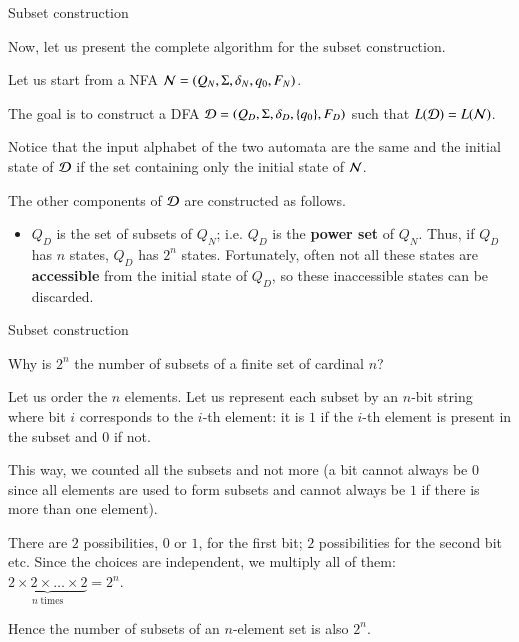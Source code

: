%
\begin{frame}{Subset construction}

Now, let us present the complete algorithm for the subset
construction.

\bigskip

Let us start from a NFA \({\cal N} = (Q_N, \Sigma, \delta_N, q_0, F_N)\).

\bigskip

The goal is to construct a DFA \({\cal D} = (Q_D, \Sigma, \delta_D,
\{q_0\}, F_D)\) such that \(L({\cal D}) = L({\cal N})\).

\bigskip

Notice that the input alphabet of the two automata are the same and
the initial state of \({\cal D}\) if the set containing only the
initial state of \({\cal N}\).

\bigskip

The other components of \({\cal D}\) are constructed as follows.
\begin{itemize}

  \item \(Q_D\) is the set of subsets of \(Q_N\); i.e. \(Q_D\) is the
  \textbf{power set} of \(Q_N\). Thus, if \(Q_D\) has \(n\) states,
  \(Q_D\) has \(2^n\) states. Fortunately, often not all these states
  are \textbf{accessible} from the initial state of \(Q_D\), so these
  inaccessible states can be discarded.

\end{itemize}

\end{frame}

%
\begin{frame}{Subset construction}

\label{state_explosion}

Why is \(2^n\) the number of subsets of a finite set of cardinal
\(n\)?

\bigskip

Let us order the \(n\) elements. Let us represent each subset by an
\(n\)-bit string where bit \(i\) corresponds to the \(i\)-th element:
it is \(1\) if the \(i\)-th element is present in the subset and \(0\)
if not.

\bigskip

This way, we counted all the subsets and not more (a bit cannot always
be \(0\) since all elements are used to form subsets and cannot always
be \(1\) if there is more than one element).

\bigskip

There are \(2\) possibilities, \(0\) or \(1\), for the first bit;
\(2\) possibilities for the second bit etc. Since the choices are
independent, we multiply all of them: \(\underbrace{2 \times 2 \times
  \dots \times 2}_{n \; \text{times}} = 2^n\).

\bigskip

Hence the number of subsets of an \(n\)-element set is also \(2^n\).

\end{frame}

